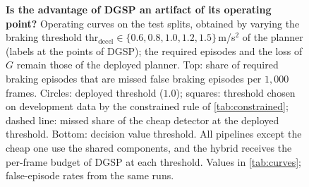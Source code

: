 \documentclass[10pt,letterpaper]{article}
\newcommand{\method}{DGSP\xspace}
\newcommand{\G}{G}
\theoremstyle{remark}
\theoremstyle{plain}
\theoremstyle{definition}
\begin{document}
\begin{figure}[!htbp]
\vspace{2pt}
\caption{\textbf{Is the advantage of \method an artifact of its operating point?} Operating curves on the test splits, obtained by varying the braking threshold thr$_{\mathrm{decel}}\in\{0.6,0.8,1.0,1.2,1.5\}$\,m/s$^2$ of the planner (labels at the points of \method); the required episodes and the loss of $\G$ remain those of the deployed planner. Top: share of required braking episodes that are missed \vs false braking episodes per $1{,}000$ frames. Circles: deployed threshold ($1.0$); squares: threshold chosen on development data by the constrained rule of \cref{tab:constrained}; dashed line: missed share of the cheap detector at the deployed threshold. Bottom: decision value \vs threshold. All pipelines except the cheap one use the shared components, and the hybrid receives the per-frame budget of \method at each threshold. Values in \cref{tab:curves}; false-episode rates from the same runs.}
\label{fig:operating}
\end{figure}
\end{document}
